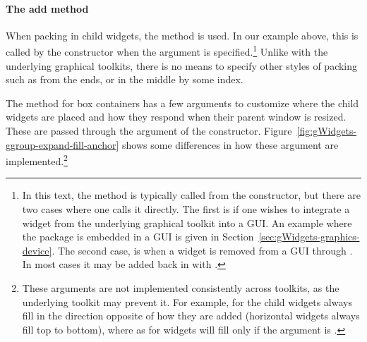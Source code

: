 \paragraph{The add method}
When packing in child widgets, the  method is
used. In our example above, this is called by the
 constructor when the  argument is
specified.\footnote{In this text, the  method is typically called
from the constructor, but there are two cases where one calls it
directly. The first is if one wishes to integrate a widget from the
underlying graphical toolkit into a  GUI. An example
where the  package is embedded in a GUI is given in 
Section~\ref{sec:gWidgets-graphics-device}. The second case, is when a
widget is removed from a GUI through . In most cases it
may be added back in with .} Unlike with the underlying graphical toolkits, there is no
means to specify other styles of packing such as from the ends, or in
the middle by some index.

The  method for box containers has a few arguments to
customize where the child widgets are placed and how they respond when
their parent window is resized. These are passed through the
  argument of the
constructor. Figure~\ref{fig:gWidgets-ggroup-expand-fill-anchor} shows
some differences in how these argument are
implemented.\footnote{These arguments are not implemented
  consistently across toolkits, as the underlying toolkit may prevent
  it. For example, for  the child widgets always fill in
  the direction opposite of how they are added (horizontal widgets
  always fill top to bottom), where as for  widgets will
  fill only if the  argument is .}

